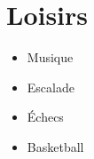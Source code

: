 \documentclass[9.5pt]{article}
\begin{document}
\begin{minipage}[t]{0.305\textwidth}
\section*{\large\bfseries\color{accent}Loisirs}
\vspace{-2pt}
\small
\begin{itemize}
  \item Musique
  \item Escalade
  \item Échecs
  \item Basketball
\end{itemize}

\end{minipage}
\end{document}
